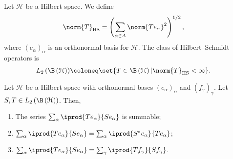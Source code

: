 \documentclass[10pt]{mypackage}
\begin{document}
\begin{definition}
  Let $\mathcal{H}$ be a Hilbert space. We define
  \begin{align*}
    \norm{T}_{\operatorname{HS}} &= \left( \sum_{\alpha\in A}\norm{Te_{\alpha}}^2 \right)^{1/2},
  \end{align*}
  where $\left( e_{\alpha} \right)_{\alpha}$ is an orthonormal basis for $\mathcal{H}$. The class of Hilbert--Schmidt operators is
  \begin{align*}
    L_2\left( \B\left( \mathcal{H} \right) \right) &\coloneq \set{T\in \B\left( \mathcal{H} \right) | \norm{T}_{\operatorname{HS}} < \infty}.
  \end{align*}
\end{definition}
\begin{lemma}
  Let $\mathcal{H}$ be a Hilbert space with orthonormal bases $\left( e_{\alpha} \right)_{\alpha}$ and $\left( f_{\gamma} \right)_{\gamma}$. Let $S,T\in L_2\left( \B\left( \mathcal{H} \right) \right)$. Then,
  \begin{enumerate}[(1)]
    \item The series $\sum_{\alpha} \iprod{Te_{\alpha}}{Se_{\alpha}}$ is summable;
    \item $\sum_{\alpha} \iprod{Te_{\alpha}}{Se_{\alpha}} = \sum_{\alpha} \iprod{S^{\ast}e_{\alpha}}{Te_{\alpha}}$;
    \item $\sum_{\alpha} \iprod{Te_{\alpha}}{Se_{\alpha}} = \sum_{\gamma} \iprod{Tf_{\gamma}}{Sf_{\gamma}}$.
  \end{enumerate}
\end{lemma}
\end{document}
